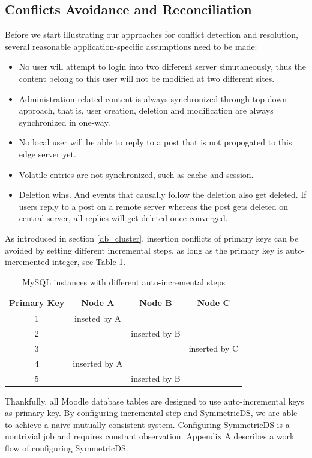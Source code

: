\subsection{Conflicts Avoidance and Reconciliation} \label{multi_master}
Before we start illustrating our approaches for conflict detection and resolution, several reasonable application-specific assumptions need to be made:
\begin{itemize}
\item No user will attempt to login into two different server simutaneously, thus the content belong to this user will not be modified at two different sites.
\item Administration-related content is always synchronized through top-down approach, that is, user creation, deletion and modification are always synchronized in one-way.
\item No local user will be able to reply to a post that is not propogated to this edge server yet.
\item Volatile entries are not synchronized, such as cache and session.
\item Deletion wins. And events that causally follow the deletion also get deleted. If users reply to a post on a remote server whereas the post gets deleted on central server, all replies will get deleted once converged.
\end{itemize}

As introduced in section \ref{db_cluster}, insertion conflicts of primary keys can be avoided by setting different incremental steps, as long as the primary key is auto-incremented integer, see Table \ref{mysql_key_inc}.

\begin{table}[htbp]
\centering
\begin{tabular}{c|c|c|c}
Primary Key & Node A & Node B & Node C\\
\hline
1 & inseted by A & & \\
2 & & inserted by B & \\
3 & & & inserted by C \\
4 & inserted by A & & \\
5 & & inserted by B & \\
\end{tabular}
\caption{MySQL instances with different auto-incremental steps}
\label{mysql_key_inc}
\end{table}

Thankfully, all Moodle database tables are designed to use auto-incremental keys as primary key. By configuring incremental step and SymmetricDS, we are able to achieve a naive mutually consistent system. Configuring SymmetricDS is a nontrivial job and requires constant observation. Appendix A describes a work flow of configuring SymmetricDS.

